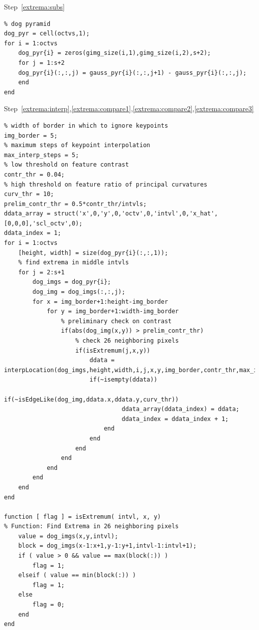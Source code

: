 Step~\ref{extrema:subs}
\begin{lstlisting}
% dog pyramid
dog_pyr = cell(octvs,1);
for i = 1:octvs
    dog_pyr{i} = zeros(gimg_size(i,1),gimg_size(i,2),s+2);
    for j = 1:s+2
    dog_pyr{i}(:,:,j) = gauss_pyr{i}(:,:,j+1) - gauss_pyr{i}(:,:,j);
    end
end
\end{lstlisting}

Step~\ref{extrema:interp},\ref{extrema:compare1},\ref{extrema:compare2},\ref{extrema:compare3}
\begin{lstlisting}
% width of border in which to ignore keypoints
img_border = 5;
% maximum steps of keypoint interpolation
max_interp_steps = 5;
% low threshold on feature contrast
contr_thr = 0.04;
% high threshold on feature ratio of principal curvatures
curv_thr = 10;
prelim_contr_thr = 0.5*contr_thr/intvls;
ddata_array = struct('x',0,'y',0,'octv',0,'intvl',0,'x_hat',[0,0,0],'scl_octv',0);
ddata_index = 1;
for i = 1:octvs
    [height, width] = size(dog_pyr{i}(:,:,1));
    % find extrema in middle intvls
    for j = 2:s+1
        dog_imgs = dog_pyr{i};
        dog_img = dog_imgs(:,:,j);
        for x = img_border+1:height-img_border
            for y = img_border+1:width-img_border
                % preliminary check on contrast
                if(abs(dog_img(x,y)) > prelim_contr_thr)
                    % check 26 neighboring pixels
                    if(isExtremum(j,x,y))
                        ddata = interpLocation(dog_imgs,height,width,i,j,x,y,img_border,contr_thr,max_interp_steps);
                        if(~isempty(ddata))
                            if(~isEdgeLike(dog_img,ddata.x,ddata.y,curv_thr))
                                 ddata_array(ddata_index) = ddata;
                                 ddata_index = ddata_index + 1;
                            end
                        end
                    end
                end
            end
        end
    end
end

function [ flag ] = isExtremum( intvl, x, y)
% Function: Find Extrema in 26 neighboring pixels
    value = dog_imgs(x,y,intvl);
    block = dog_imgs(x-1:x+1,y-1:y+1,intvl-1:intvl+1);
    if ( value > 0 && value == max(block(:)) )
        flag = 1;
    elseif ( value == min(block(:)) )
        flag = 1;
    else
        flag = 0;
    end
end
\end{lstlisting}

